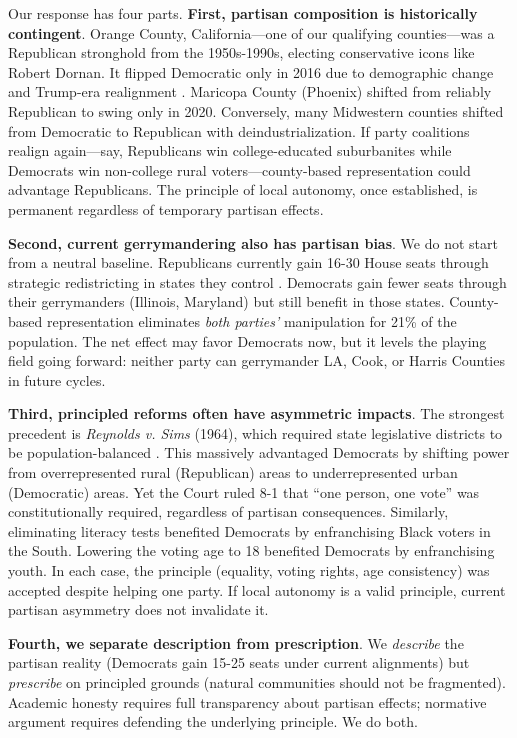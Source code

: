 Our response has four parts. \textbf{First, partisan composition is historically contingent}. Orange County, California---one of our qualifying counties---was a Republican stronghold from the 1950s-1990s, electing conservative icons like Robert Dornan. It flipped Democratic only in 2016 due to demographic change and Trump-era realignment \citep{riker2019orange}. Maricopa County (Phoenix) shifted from reliably Republican to swing only in 2020. Conversely, many Midwestern counties shifted from Democratic to Republican with deindustrialization. If party coalitions realign again---say, Republicans win college-educated suburbanites while Democrats win non-college rural voters---county-based representation could advantage Republicans. The principle of local autonomy, once established, is permanent regardless of temporary partisan effects.

\textbf{Second, current gerrymandering also has partisan bias}. We do not start from a neutral baseline. Republicans currently gain 16-30 House seats through strategic redistricting in states they control \citep{chen2013unintentional}. Democrats gain fewer seats through their gerrymanders (Illinois, Maryland) but still benefit in those states. County-based representation eliminates \emph{both parties'} manipulation for 21\% of the population. The net effect may favor Democrats now, but it levels the playing field going forward: neither party can gerrymander LA, Cook, or Harris Counties in future cycles.

\textbf{Third, principled reforms often have asymmetric impacts}. The strongest precedent is \emph{Reynolds v. Sims} (1964), which required state legislative districts to be population-balanced \citep{reynolds1964sims}. This massively advantaged Democrats by shifting power from overrepresented rural (Republican) areas to underrepresented urban (Democratic) areas. Yet the Court ruled 8-1 that ``one person, one vote'' was constitutionally required, regardless of partisan consequences. Similarly, eliminating literacy tests benefited Democrats by enfranchising Black voters in the South. Lowering the voting age to 18 benefited Democrats by enfranchising youth. In each case, the principle (equality, voting rights, age consistency) was accepted despite helping one party. If local autonomy is a valid principle, current partisan asymmetry does not invalidate it.

\textbf{Fourth, we separate description from prescription}. We \emph{describe} the partisan reality (Democrats gain 15-25 seats under current alignments) but \emph{prescribe} on principled grounds (natural communities should not be fragmented). Academic honesty requires full transparency about partisan effects; normative argument requires defending the underlying principle. We do both.

